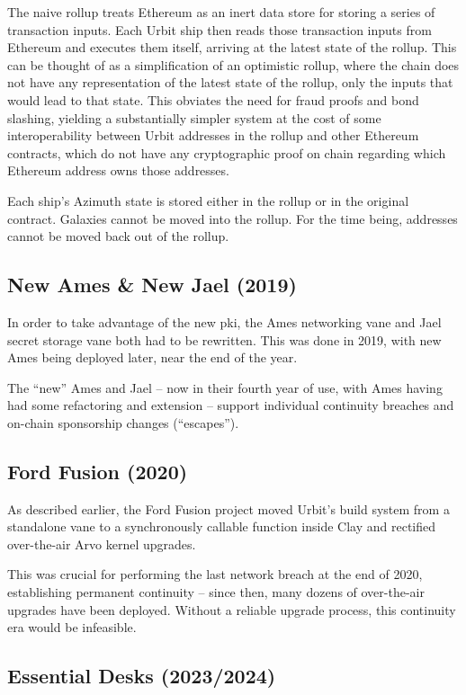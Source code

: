 \documentclass[twoside]{article}
\begin{document}
The naive rollup treats Ethereum as an inert data store for storing a series of transaction inputs.  Each Urbit ship then reads those transaction inputs from Ethereum and executes them itself, arriving at the latest state of the rollup.  This can be thought of as a simplification of an optimistic rollup, where the chain does not have any representation of the latest state of the rollup, only the inputs that would lead to that state.  This obviates the need for fraud proofs and bond slashing, yielding a substantially simpler system at the cost of some interoperability between Urbit addresses in the rollup and other Ethereum contracts, which do not have any cryptographic proof on chain regarding which Ethereum address owns those addresses.

Each ship's Azimuth state is stored either in the rollup or in the original contract.  Galaxies cannot be moved into the rollup.  For the time being, addresses cannot be moved back out of the rollup.

\subsection{New Ames \& New Jael (2019)}

In order to take advantage of the new {\sc pki}, the Ames networking vane and Jael secret storage vane both had to be rewritten.  This was done in 2019, with new Ames being deployed later, near the end of the year.  

The ``new'' Ames and Jael – now in their fourth year of use, with Ames having had some refactoring and extension – support individual continuity breaches and on-chain sponsorship changes (``escapes'').  

\subsection{Ford Fusion (2020)}

As described earlier, the Ford Fusion project moved Urbit's build system from a standalone vane to a synchronously callable function inside Clay and rectified over-the-air Arvo kernel upgrades.

This was crucial for performing the last network breach at the end of 2020, establishing permanent continuity – since then, many dozens of over-the-air upgrades have been deployed.  Without a reliable upgrade process, this continuity era would be infeasible.

\subsection{Essential Desks (2023/2024)}
\end{document}
